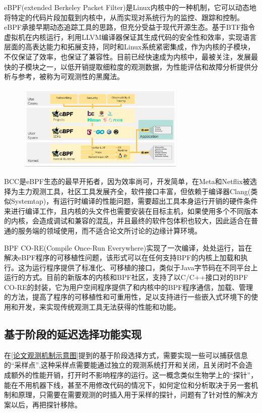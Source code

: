 \documentclass[master,anonymous]{shtthesis}
\begin{document}
eBPF(extended Berkeley Packet Filter)是Linux内核中的一种机制，它可以动态地将特定的代码片段加载到内核中，从而实现对系统行为的监控、跟踪和控制。eBPF承接早期动态追踪工具的思路，但充分受益于现代开源生态。基于BTF指令虚拟机在内核运行，利用LLVM编译器保证其生成代码的安全性和效率，实现语言层面的高表达能力和拓展支持，同时和Linux系统紧密集成，作为内核的子模块，不仅保证了效率，也保证了兼容性。目前已经快速成为内核中，最被关注，发展最快的子模块之一，以低开销提取细粒度的观测数据，为性能评估和故障分析提供分析与参考，被称为可观测性的黑魔法。

\begin{figure}[htbp]
	\centering
	\includegraphics[width=8cm]{img/ebpf.png}
	\label{ebpf概览}
\end{figure}

BCC是eBPF生态的最早开拓者，因为效率尚可，开发简单，在Meta和Netflix被选择为主力观测工具，社区工具发展齐全，软件接口丰富，但依赖于编译器Clang(类似Systemtap)，有运行时编译的性能问题，需要超出工具本身运行开销的硬件条件来进行编译工作，且内核的头文件也需要安装在目标主机，如果使用多个不同版本的内核，会造成调试和兼容的混乱，并且最终的软件包体积也较大，因此适合在普通的服务端的领域使用，而不适合论文所讨论的边缘计算环境。

BPF CO-RE(Compile Once-Run Everywhere)实现了一次编译，处处运行，旨在解决eBPF程序的可移植性问题，该形式可以在任何支持BPF的内核上加载和执行。这为运行程序提供了标准化、可移植的接口，类似于Java字节码在不同平台上运行的方式。目前的新版本的内核和BPF社区，支持了以C/C++接口对的BPF CO-RE的封装，它为用户空间程序提供了和内核中的BPF程序通信，加载、管理的方法，提高了程序的可移植性和可重用性，足以支持进行一些嵌入式环境下的使用和开发，来实现传统观测工具无法获得的性能和功能。

\subsection{基于阶段的延迟选择功能实现}\label{基于阶段的延迟选择功能实现}
在\ref{论文观测机制示意图}提到的基于阶段选择方式，需要实现一些可以捕获信息的“采样点”,这种采样点需要能通过独立的观测系统打开和关闭，且关闭时不会造成额外的性能开销，打开时不影响程序的运行。这一概念类似生物学上的“探针”，能在不用机器下线，甚至不用修改代码的情况下，如何定位和分析取决于另一套机制和原理，只需要在需要观测的时插入用于采样的探针，问题有了针对性的解决方案以后，再把探针移除。
\end{document}

